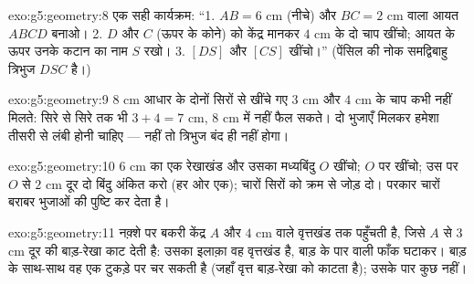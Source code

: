 \begin{solution}{exo:g5:geometry:8}
एक सही कार्यक्रम: ``1. $AB = 6$ cm (नीचे) और $BC = 2$ cm वाला
आयत $ABCD$ बनाओ। 2. $D$ और $C$ (ऊपर के कोने) को केंद्र मानकर
$4$ cm  के दो चाप खींचो; आयत के ऊपर उनके कटान का नाम $S$
रखो। 3. $[DS]$ और $[CS]$ खींचो।'' (पेंसिल की नोक समद्विबाहु
त्रिभुज $DSC$ है।)
\end{solution}

\begin{solution}{exo:g5:geometry:9}
$8$ cm आधार के दोनों सिरों से खींचे गए $3$ cm और $4$ cm 
के चाप कभी नहीं मिलते: सिरे से सिरे तक भी $3 + 4 = 7$ cm,
$8$ cm में नहीं फैल सकते। दो भुजाएँ मिलकर हमेशा तीसरी से लंबी
होनी चाहिए --- नहीं तो त्रिभुज बंद ही नहीं होगा।
\end{solution}

\begin{solution}{exo:g5:geometry:10}
$6$ cm का एक रेखाखंड और उसका मध्यबिंदु $O$ खींचो; $O$ पर 
खींचो; उस पर $O$ से $2$ cm दूर दो बिंदु अंकित करो (हर ओर एक);
चारों सिरों को क्रम से जोड़ दो। परकार चारों बराबर भुजाओं की
पुष्टि कर देता है।
\end{solution}

\begin{solution}{exo:g5:geometry:11}
नक़्शे पर बकरी केंद्र $A$ और  $4$ cm वाले वृत्तखंड तक
पहुँचती है, जिसे $A$ से $3$ cm दूर की बाड़-रेखा काट देती है:
उसका इलाक़ा वह वृत्तखंड है, बाड़ के पार वाली फाँक घटाकर। बाड़ के
साथ-साथ वह एक टुकड़े पर चर सकती है (जहाँ वृत्त बाड़-रेखा को
काटता है); उसके पार कुछ नहीं।

\end{solution}
